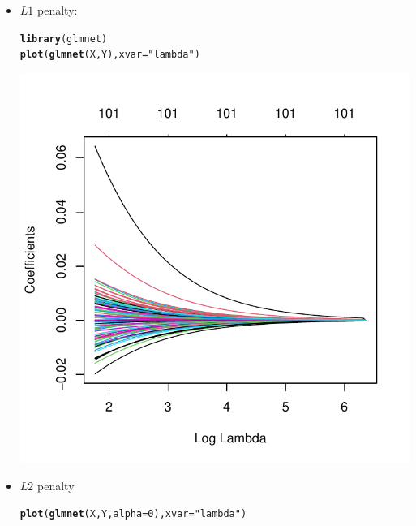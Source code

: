 \documentclass[a4paper]{article}
\makeatletter
\def\maxwidth{ %
  \ifdim\Gin@nat@width>\linewidth
    \linewidth
  \else
    \Gin@nat@width
  \fi
}
\newcommand{\hlnum}[1]{\textcolor[rgb]{0.686,0.059,0.569}{#1}}%
\newcommand{\hlstr}[1]{\textcolor[rgb]{0.192,0.494,0.8}{#1}}%
\newcommand{\hlstd}[1]{\textcolor[rgb]{0.345,0.345,0.345}{#1}}%
\newcommand{\hlkwc}[1]{\textcolor[rgb]{0.333,0.667,0.333}{#1}}%
\newcommand{\hlkwd}[1]{\textcolor[rgb]{0.737,0.353,0.396}{\textbf{#1}}}%
\newenvironment{kframe}{%
 \def\at@end@of@kframe{}%
 \ifinner\ifhmode%
  \def\at@end@of@kframe{\end{minipage}}%
  \begin{minipage}{\columnwidth}%
 \fi\fi%
 \def\FrameCommand##1{\hskip\@totalleftmargin \hskip-\fboxsep
 \colorbox{shadecolor}{##1}\hskip-\fboxsep
     \hskip-\linewidth \hskip-\@totalleftmargin \hskip\columnwidth}%
 \MakeFramed {\advance\hsize-\width
   \@totalleftmargin\z@ \linewidth\hsize
   \@setminipage}}%
 {\par\unskip\endMakeFramed%
 \at@end@of@kframe}
\newenvironment{knitrout}{}{} %
\makeatother
\begin{document}
{\begin{enumerate}
\begin{itemize}
\item $L1$ penalty:
\begin{knitrout}
\color{fgcolor}\begin{kframe}
\begin{alltt}
\hlkwd{library}\hlstd{(glmnet)}
\hlkwd{plot}\hlstd{(}\hlkwd{glmnet}\hlstd{(X, Y),} \hlkwc{xvar} \hlstd{=} \hlstr{"lambda"}\hlstd{)}
\end{alltt}
\end{kframe}
\includegraphics[width=\maxwidth]{figure/unnamed-chunk-6-1} 
\end{knitrout}
\item $L2$ penalty
\begin{knitrout}
\color{fgcolor}\begin{kframe}
\begin{alltt}
\hlkwd{plot}\hlstd{(}\hlkwd{glmnet}\hlstd{(X, Y,} \hlkwc{alpha} \hlstd{=} \hlnum{0}\hlstd{),} \hlkwc{xvar} \hlstd{=} \hlstr{"lambda"}\hlstd{)}
\end{alltt}
\end{kframe}

\end{knitrout}
\end{itemize}
\end{enumerate}}
\end{document}
